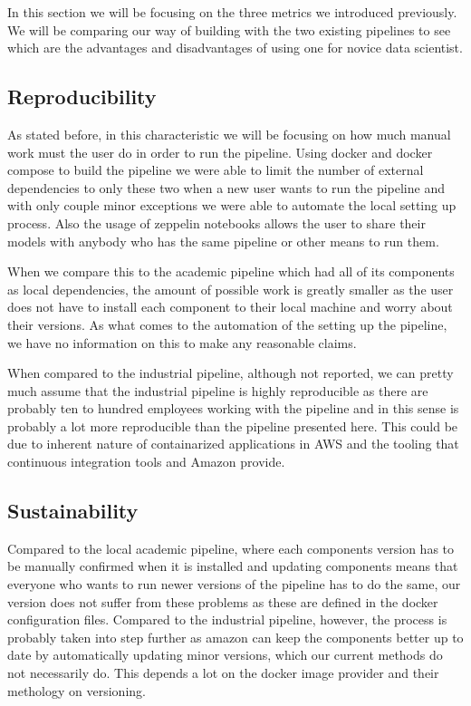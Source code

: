 In this section we will be focusing on the three metrics we introduced previously.
We will be comparing our way of building with the two existing pipelines to see which are the advantages and disadvantages of using one for novice data scientist.

\subsection{Reproducibility}

As stated before, in this characteristic we will be focusing on how much manual work must the user do in order to run the pipeline.
Using docker and docker compose to build the pipeline we were able to limit the number of external dependencies to only these two when a new user wants to run the pipeline and with only couple minor exceptions we were able to automate the local setting up process.
Also the usage of zeppelin notebooks allows the user to share their models with anybody who has the same pipeline or other means to run them.

When we compare this to the academic pipeline which had all of its components as local dependencies, the amount of possible work is greatly smaller as the user does not have to install each component to their local machine and worry about their versions.
As what comes to the automation of the setting up the pipeline, we have no information on this to make any reasonable claims.

When compared to the industrial pipeline, although not reported, we can pretty much assume that the industrial pipeline is highly reproducible as there are probably ten to hundred employees working with the pipeline and in this sense is probably a lot more reproducible than the pipeline presented here.
This could be due to inherent nature of containarized applications in AWS and the tooling that continuous integration tools and Amazon provide.

\subsection{Sustainability}

Compared to the local academic pipeline, where each components version has to be manually confirmed when it is installed and updating components means that everyone who wants to run newer versions of the pipeline has to do the same, our version does not suffer from these problems as these are defined in the docker configuration files.
Compared to the industrial pipeline, however, the process is probably taken into step further as amazon can keep the components better up to date by automatically updating minor versions, which our current methods do not necessarily do.
This depends a lot on the docker image provider and their methology on versioning.


